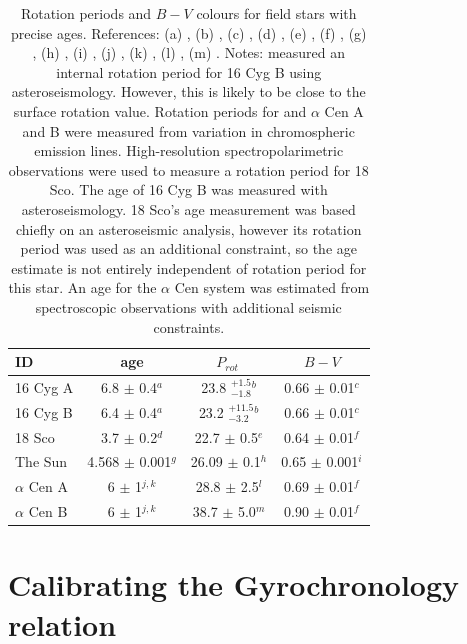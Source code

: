 \documentclass[useAMS, usenatbib]{mn2e}
\newcommand{\prot}{$P_{rot}~$}
\begin{document}
\begin{table}
\caption{Rotation periods and $B-V$ colours for field stars with precise
	ages. References: (a) \citet{Metcalfe2012}, (b) \citet{Davies2014}, (c)
\citet{Moffett1979}, (d) \citet{Li2012}, (e) \citet{Petit2008}, (f)
\citet{Mermilliod1986}, (g) \citet{Bouvier2010}, (h) \citet{Donahue1996}, (i)
\citet{Cox2000}, (j) \citet{Bazot2012}, (k) \citet{Yildiz2007}, (l)
\citet{Hallam1991}, (m) \citet{Dumusque2012}.
Notes: \citet{Davies2014} measured an internal rotation period for 16 Cyg B
using asteroseismology.
However, this is likely to be close to the surface rotation value.
Rotation periods for and $\alpha$ Cen A and B were measured
from variation in chromospheric emission lines.
High-resolution spectropolarimetric observations were used to measure
a rotation period for 18 Sco.
The age of 16 Cyg B was measured with asteroseismology.
18 Sco's age measurement was based chiefly on an asteroseismic analysis,
however its rotation period was used as an additional constraint, so the age
estimate is not entirely independent of rotation period for this star.
An age for the $\alpha$ Cen system was estimated from spectroscopic
observations with additional seismic constraints.\label{tab:field}}

\begin{tabular}{lccc}
\hline\hline
{ID} & {age} & {\prot} & {$B-V$} \\
\hline
16 Cyg A & 6.8 $\pm$ 0.4$^a$ & 23.8 $^{+1.5}_{-1.8}$$^b$ & 0.66 $\pm$ 0.01$^c$ \\
16 Cyg B & 6.4 $\pm$ 0.4$^a$ & 23.2 $^{+11.5}_{-3.2}$$^b$ & 0.66 $\pm$ 0.01$^c$ \\
18 Sco & 3.7 $\pm$ 0.2$^d$ & 22.7 $\pm$ 0.5$^e$ & 0.64 $\pm$ 0.01$^f$ \\
The Sun & 4.568 $\pm$ 0.001$^g$ & 26.09 $\pm$ 0.1$^h$ & 0.65 $\pm$ 0.001$^i$ \\
$\alpha$ Cen A & 6 $\pm$ 1$^{j, k}$ & 28.8 $\pm$ 2.5$^{l}$ &
0.69 $\pm$ 0.01$^f$ \\
$\alpha$ Cen B & 6 $\pm$ 1$^{j, k}$ & 38.7 $\pm$ 5.0$^{m}$ &
0.90 $\pm$ 0.01$^f$ \\
\hline
\end{tabular}
\end{table}

\section{Calibrating the Gyrochronology relation}
\label{sec:gyro_cal}
\end{document}
